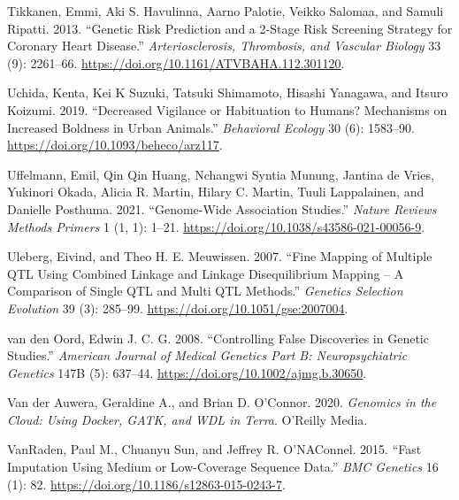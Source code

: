 \documentclass[
]{book}
\newlength{\cslhangindent}
\newlength{\cslentryspacingunit} %
\newenvironment{CSLReferences}[2] %
 {%
  \setlength{\parindent}{0pt}
  \ifodd #1
  \let\oldpar\par
  \def\par{\hangindent=\cslhangindent\oldpar}
  \fi
  \setlength{\parskip}{#2\cslentryspacingunit}
 }%
 {}
\begin{document}
\begin{CSLReferences}{1}{0}
\leavevmode{}%
Tikkanen, Emmi, Aki S. Havulinna, Aarno Palotie, Veikko Salomaa, and Samuli Ripatti. 2013. {``Genetic {Risk Prediction} and a 2-{Stage Risk Screening Strategy} for {Coronary Heart Disease}.''} \emph{Arteriosclerosis, Thrombosis, and Vascular Biology} 33 (9): 2261--66. \url{https://doi.org/10.1161/ATVBAHA.112.301120}.

\leavevmode{}%
Uchida, Kenta, Kei K Suzuki, Tatsuki Shimamoto, Hisashi Yanagawa, and Itsuro Koizumi. 2019. {``Decreased Vigilance or Habituation to Humans? {Mechanisms} on Increased Boldness in Urban Animals.''} \emph{Behavioral Ecology} 30 (6): 1583--90. \url{https://doi.org/10.1093/beheco/arz117}.

\leavevmode{}%
Uffelmann, Emil, Qin Qin Huang, Nchangwi Syntia Munung, Jantina de Vries, Yukinori Okada, Alicia R. Martin, Hilary C. Martin, Tuuli Lappalainen, and Danielle Posthuma. 2021. {``Genome-Wide Association Studies.''} \emph{Nature Reviews Methods Primers} 1 (1, 1): 1--21. \url{https://doi.org/10.1038/s43586-021-00056-9}.

\leavevmode{}%
Uleberg, Eivind, and Theo H. E. Meuwissen. 2007. {``Fine Mapping of Multiple {QTL} Using Combined Linkage and Linkage Disequilibrium Mapping -- {A} Comparison of Single {QTL} and Multi {QTL} Methods.''} \emph{Genetics Selection Evolution} 39 (3): 285--99. \url{https://doi.org/10.1051/gse:2007004}.

\leavevmode{}%
van den Oord, Edwin J. C. G. 2008. {``Controlling False Discoveries in Genetic Studies.''} \emph{American Journal of Medical Genetics Part B: Neuropsychiatric Genetics} 147B (5): 637--44. \url{https://doi.org/10.1002/ajmg.b.30650}.

\leavevmode{}%
Van der Auwera, Geraldine A., and Brian D. O'Connor. 2020. \emph{Genomics in the Cloud: Using {Docker}, {GATK}, and {WDL} in {Terra}}. {O'Reilly Media}.

\leavevmode{}%
VanRaden, Paul M., Chuanyu Sun, and Jeffrey R. O'NAConnel. 2015. {``Fast Imputation Using Medium or Low-Coverage Sequence Data.''} \emph{BMC Genetics} 16 (1): 82. \url{https://doi.org/10.1186/s12863-015-0243-7}.


\end{CSLReferences}
\end{document}
